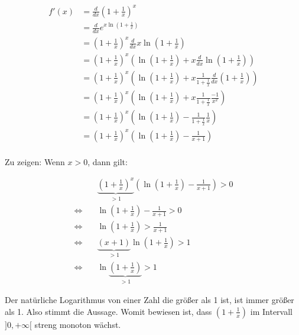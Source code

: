 \documentclass[a4paper,german,12pt,smallheadings]{scrartcl}
\begin{document}
\begin{align*}
  f'(x) &= \frac{d}{dx} \left(1+\frac{1}{x}\right)^x \\
        &= \frac{d}{dx} e^{x \ln\left(1+\frac{1}{x}\right)} \\
        &= \left(1+\frac{1}{x}\right)^x \frac{d}{dx} x \ln\left(1+\frac{1}{x}\right)  \\
        &= \left(1+\frac{1}{x}\right)^x \left( \ln\left(1+\frac{1}{x}\right) + x \frac{d}{dx} \ln\left(1+\frac{1}{x}\right) \right) \\
        &= \left(1+\frac{1}{x}\right)^x \left( \ln\left(1+\frac{1}{x}\right) + x \frac{1}{1+\frac{1}{x}} \frac{d}{dx} \left(1+\frac{1}{x}\right) \right) \\
        &= \left(1+\frac{1}{x}\right)^x \left( \ln\left(1+\frac{1}{x}\right) + x \frac{1}{1+\frac{1}{x}} \frac{-1}{x^2} \right) \\
        &= \left(1+\frac{1}{x}\right)^x \left( \ln\left(1+\frac{1}{x}\right) - \frac{1}{1+\frac{1}{x}} \frac{1}{x} \right) \\
        &= \left(1+\frac{1}{x}\right)^x \left( \ln\left(1+\frac{1}{x}\right) - \frac{1}{x+1} \right) \\
\end{align*}

Zu zeigen: Wenn $x > 0$, dann gilt:

\begin{align*}
  &\underbrace{\left(1+\frac{1}{x}\right)^x}_{> 1} \left( \ln\left(1+\frac{1}{x}\right) - \frac{1}{x+1} \right) > 0 \\
  \Leftrightarrow\quad& \ln\left(1+\frac{1}{x}\right) - \frac{1}{x+1} > 0 \\
  \Leftrightarrow\quad& \ln\left(1+\frac{1}{x}\right) > \frac{1}{x+1} \\
  \Leftrightarrow\quad& \underbrace{(x+1)}_{>1} \ln\left(1+\frac{1}{x}\right) > 1 \\
  \Leftrightarrow\quad& \ln\underbrace{\left(1+\frac{1}{x}\right)}_{>1} > 1
\end{align*}

Der natürliche Logarithmus von einer Zahl die größer als 1 ist, ist immer
größer als 1. Also stimmt die Aussage. Womit bewiesen ist, dass
$\left(1+\frac{1}{x}\right)$ im Intervall $]0,+\infty[$ streng monoton wächst.
\end{document}
